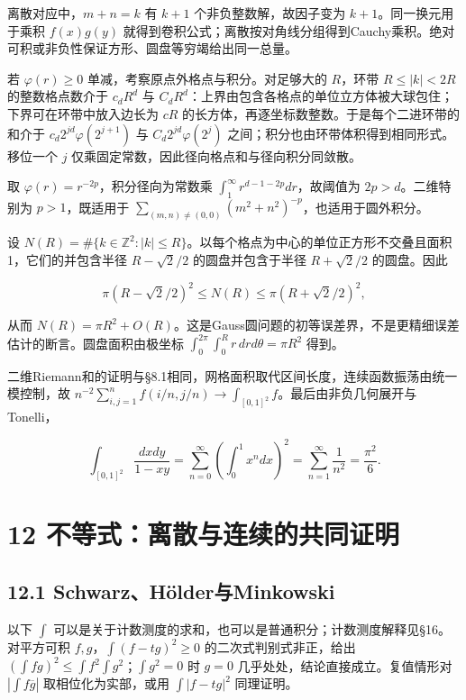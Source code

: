\documentclass[11pt,a4paper]{article}
\begin{document}
离散对应中，\(m+n=k\) 有 \(k+1\) 个非负整数解，故因子变为
\(k+1\)。同一换元用于乘积 \(f(x)g(y)\)
就得到卷积公式；离散按对角线分组得到Cauchy乘积。绝对可积或非负性保证方形、圆盘等穷竭给出同一总量。

若 \(\varphi(r)\ge0\) 单减，考察原点外格点与积分。对足够大的 \(R\)，环带
\(R\le|k|<2R\) 的整数格点数介于 \(c_dR^d\) 与
\(C_dR^d\)：上界由包含各格点的单位立方体被大球包住；下界可在环带中放入边长为
\(cR\) 的长方体，再逐坐标数整数。于是每个二进环带的和介于
\(c_d2^{jd}\varphi(2^{j+1})\) 与 \(C_d2^{jd}\varphi(2^j)\)
之间；积分也由环带体积得到相同形式。移位一个 \(j\)
仅乘固定常数，因此径向格点和与径向积分同敛散。

取 \(\varphi(r)=r^{-2p}\)，积分径向为常数乘
\(\int_1^\infty r^{d-1-2p}dr\)，故阈值为 \(2p>d\)。二维特别为
\(p>1\)，既适用于
\(\sum_{(m,n)\ne(0,0)}(m^2+n^2)^{-p}\)，也适用于圆外积分。

设
\(N(R)=\#\{k\in\mathbb Z^2:|k|\le R\}\)。以每个格点为中心的单位正方形不交叠且面积1，它们的并包含半径
\(R-\sqrt2/2\) 的圆盘并包含于半径 \(R+\sqrt2/2\) 的圆盘。因此

\[
\pi(R-\sqrt2/2)^2\le N(R)\le\pi(R+\sqrt2/2)^2,
\]

从而
\(N(R)=\pi R^2+O(R)\)。这是Gauss圆问题的初等误差界，不是更精细误差估计的断言。圆盘面积由极坐标
\(\int_0^{2\pi}\int_0^Rr\,drd\theta=\pi R^2\) 得到。

二维Riemann和的证明与§8.1相同，网格面积取代区间长度，连续函数振荡由统一模控制，故
\(n^{-2}\sum_{i,j=1}^nf(i/n,j/n)\to\int_{[0,1]^2}f\)。最后由非负几何展开与Tonelli，

\[
\int_{[0,1]^2}\frac{dxdy}{1-xy}
=\sum_{n=0}^\infty\left(\int_0^1x^ndx\right)^2
=\sum_{n=1}^\infty\frac1{n^2}=\frac{\pi^2}{6}.
\]

\clearpage

\section{12
不等式：离散与连续的共同证明}\label{ux4e0dux7b49ux5f0fux79bbux6563ux4e0eux8fdeux7eedux7684ux5171ux540cux8bc1ux660e}

\subsection{12.1
Schwarz、Hölder与Minkowski}\label{schwarzhuxf6lderux4e0eminkowski}

以下 \(\int\)
可以是关于计数测度的求和，也可以是普通积分；计数测度解释见§16。对平方可积
\(f,g\)，\(\int(f-tg)^2\ge0\) 的二次式判别式非正，给出
\((\int fg)^2\le\int f^2\int g^2\)；\(\int g^2=0\) 时 \(g=0\)
几乎处处，结论直接成立。复值情形对 \(|\int f\overline g|\)
取相位化为实部，或用 \(\int|f-tg|^2\) 同理证明。
\end{document}
